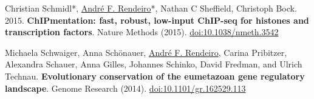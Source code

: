 \documentclass[11pt,a4paper,roman]{moderncv} %
\begin{document}
\begin{etaremune}[leftmargin=1.0cm, itemindent=0pt, topsep=10pt, itemsep=2pt, partopsep=0pt, parsep=0pt]
        \item Christian Schmidl*, \underline{André F. Rendeiro}*,  Nathan C Sheffield, Christoph Bock. 2015. \textbf{ChIPmentation: fast, robust, low-input ChIP-seq for histones and transcription factors}. Nature Methods (2015).
        \href{https://dx.doi.org/10.1038/nmeth.3542}{doi:10.1038/nmeth.3542}

        \item Michaela Schwaiger, Anna Schönauer, \underline{André F. Rendeiro}, Carina Pribitzer, Alexandra Schauer, Anna Gilles, Johannes Schinko, David Fredman, and Ulrich Technau. \textbf{Evolutionary conservation of the eumetazoan gene regulatory landscape}. Genome Research (2014).
        \href{https://dx.doi.org/10.1101/gr.162529.113}{doi:10.1101/gr.162529.113}

        \end{etaremune}
\end{document}
